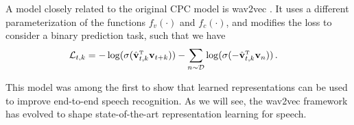{A model closely related to the original CPC model is wav2vec \parencite{schneider_wav2vec_2019}. It uses a different parameterization of the functions $f_v(\cdot)$ and $f_c(\cdot)$, and modifies the loss to consider a binary prediction task, such that we have
%
\begin{align}
    \mathcal{L}_{t,k} &= - \log(\sigma(\hat{\mathbf{v}}_{t,k}^{\text{\tiny T}}\mathbf{v}_{t+k})) - \sum_{n \sim \mathcal{D}} \log(\sigma(-\hat{\mathbf{v}}_{t,k}^{\text{\tiny T}}\mathbf{v}_{n})) \,.
    \label{eq_brief: wav2vec loss}
\end{align}

\noindent This model was among the first to show that learned representations can be used to improve end-to-end speech recognition. As we will see, the wav2vec framework has evolved to shape state-of-the-art representation learning for speech.


}
